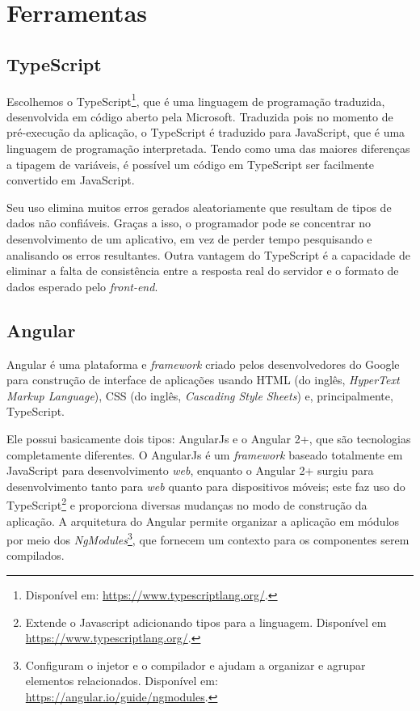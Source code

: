 \section{Ferramentas}
\label{sec:ferramentas}

\subsection{TypeScript}
\label{ssec:TypeScript}
Escolhemos o TypeScript\footnote{Disponível em: \url{https://www.typescriptlang.org/}.}, que é uma linguagem de programação traduzida, desenvolvida em código aberto pela Microsoft. Traduzida pois no momento de pré-execução da aplicação, o TypeScript é traduzido para JavaScript, que é uma linguagem de programação interpretada. Tendo como uma das maiores diferenças a tipagem de variáveis, é possível um código em TypeScript ser facilmente convertido em JavaScript. 

Seu uso elimina muitos erros gerados aleatoriamente que resultam de tipos de dados não confiáveis. Graças a isso, o programador pode se concentrar no desenvolvimento de um aplicativo, em vez de perder tempo pesquisando e analisando os erros resultantes. Outra vantagem do TypeScript é a capacidade de eliminar a falta de consistência entre a resposta real do servidor e o formato de dados esperado pelo \textit{front-end}. \cite{Jakub2019TypeScript}

\subsection{Angular}
\label{ssec:Angular}
Angular\cite{afonso2018angular} é uma plataforma e \textit{framework} criado pelos desenvolvedores do Google para construção de interface de aplicações usando HTML (do inglês, \textit{HyperText Markup Language}), CSS (do inglês, \textit{Cascading Style Sheets}) e, principalmente, TypeScript. 

Ele possui basicamente dois tipos: AngularJs e o Angular 2+, que são tecnologias completamente diferentes. O AngularJs é um \textit{framework} baseado totalmente em JavaScript para desenvolvimento \textit{web}, enquanto o Angular 2+ surgiu para desenvolvimento tanto para \textit{web} quanto para dispositivos móveis; este faz uso do TypeScript\footnote{Extende o Javascript adicionando tipos para a linguagem. Disponível em \url{https://www.typescriptlang.org/}.} e proporciona diversas mudanças no modo de construção da aplicação. A arquitetura do Angular permite organizar a aplicação em módulos por meio dos \textit{NgModules}\footnote{Configuram o injetor e o compilador e ajudam a organizar e agrupar elementos relacionados. Disponível em: \url{https://angular.io/guide/ngmodules}.}, que fornecem um contexto para os componentes serem compilados.

